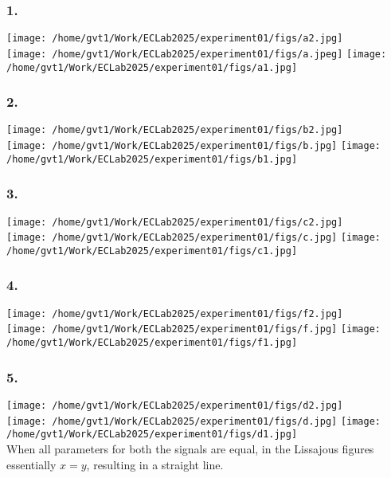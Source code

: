 \documentclass[a4paper,12pt]{article}
\begin{document}
\subsubsection{1.}
	  \begin{center}
		  \texttt{[image: /home/gvt1/Work/ECLab2025/experiment01/figs/a2.jpg]}\\
		  \texttt{[image: /home/gvt1/Work/ECLab2025/experiment01/figs/a.jpeg]}
		  \texttt{[image: /home/gvt1/Work/ECLab2025/experiment01/figs/a1.jpg]}
	  \end{center}
  \subsubsection{2.}
	  \begin{center}
		  \texttt{[image: /home/gvt1/Work/ECLab2025/experiment01/figs/b2.jpg]}\\
		  \texttt{[image: /home/gvt1/Work/ECLab2025/experiment01/figs/b.jpg]}
		  \texttt{[image: /home/gvt1/Work/ECLab2025/experiment01/figs/b1.jpg]}
	  \end{center}
  \subsubsection{3.}
	  \begin{center}
		  \texttt{[image: /home/gvt1/Work/ECLab2025/experiment01/figs/c2.jpg]}\\
		  \texttt{[image: /home/gvt1/Work/ECLab2025/experiment01/figs/c.jpg]}
		  \texttt{[image: /home/gvt1/Work/ECLab2025/experiment01/figs/c1.jpg]}
	  \end{center}
  \subsubsection{4.}
	  \begin{center}
		  \texttt{[image: /home/gvt1/Work/ECLab2025/experiment01/figs/f2.jpg]}\\
		  \texttt{[image: /home/gvt1/Work/ECLab2025/experiment01/figs/f.jpg]}
		  \texttt{[image: /home/gvt1/Work/ECLab2025/experiment01/figs/f1.jpg]}
	  \end{center}
  \subsubsection{5.}
	  \begin{center}
		  \texttt{[image: /home/gvt1/Work/ECLab2025/experiment01/figs/d2.jpg]}\\
		  \texttt{[image: /home/gvt1/Work/ECLab2025/experiment01/figs/d.jpg]}
		  \texttt{[image: /home/gvt1/Work/ECLab2025/experiment01/figs/d1.jpg]}\\
		  When all parameters for both the signals are equal, in the Lissajous figures essentially $x = y$, resulting in a straight line.
	  \end{center}
\end{document}
